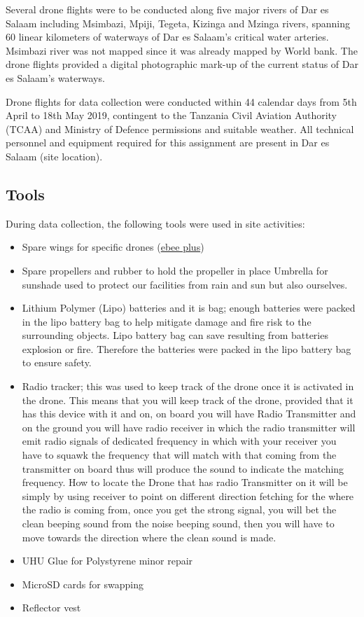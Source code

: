 \documentclass[a4paper,12pt,twoside]{article}
\begin{document}
Several drone flights were to be  conducted along five major rivers of Dar es Salaam including  Msimbazi, Mpiji, Tegeta, Kizinga and Mzinga rivers, spanning 60 linear kilometers of waterways of Dar es Salaam’s critical water arteries. Msimbazi river was not mapped since it  was  already mapped by World bank. The drone flights provided a digital photographic mark-up of the current status of Dar es Salaam’s waterways. 

Drone flights for data collection were conducted within 44 calendar days from 5th April to 18th May 2019, contingent  to the Tanzania Civil Aviation Authority (TCAA) and Ministry of Defence permissions and suitable weather. All technical personnel and equipment required for this assignment are present in Dar es Salaam (site location). 

\subsection{Tools}

    During data collection, the following tools were used in site activities:
    \begin{itemize}
    
        \item Spare wings for specific drones (\href{https://www.sensefly.com/solution/ag-360-agricultural-drone/ebee-plus-4/}{ebee plus})
        \item Spare propellers and rubber to hold the propeller in place
        Umbrella for sunshade used to protect our facilities from rain and sun but also ourselves.
        \item Lithium Polymer (Lipo) batteries and it is bag; enough batteries were packed in the lipo battery bag to help mitigate damage and fire risk to the surrounding objects. Lipo battery bag can save resulting from batteries explosion or fire. Therefore the batteries were packed in the lipo battery bag to ensure safety. 
        \item Radio tracker; this was used to keep track of the drone once it is activated in the drone. This means that you will keep track of the drone, provided that it has this device with it and on, on board you will have Radio Transmitter and on the ground you will have radio receiver in which the radio transmitter will emit radio signals of dedicated frequency in which with your receiver you have to squawk the frequency that will match with that coming from the transmitter on board thus will produce the sound to indicate the matching frequency. How to locate the Drone that has radio Transmitter on it will be simply by using receiver to point on different direction fetching for the where the radio is coming from, once you get the strong signal, you will bet the clean beeping sound from the noise beeping sound, then you will have to move towards the direction where the clean sound is made.
        \item UHU Glue for Polystyrene minor repair
        \item MicroSD cards for swapping
        \item Reflector vest
    
    \end{itemize}
\end{document}
